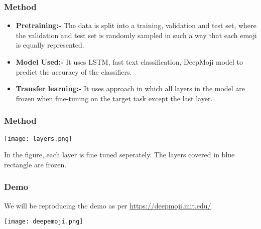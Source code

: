 \documentclass{beamer}
\begin{document}
\begin{frame}
\frametitle{Method}
\begin{itemize}
\item \textbf{Pretraining:-} The data is split into a training, validation and test set, where the validation and test set is randomly sampled in such a way that each emoji is equally represented.
\item \textbf{Model Used:-} It uses LSTM, fast text classification, DeepMoji model to predict the accuracy of the classifiers.
\item \textbf{Transfer learning:-} It uses approach in which 
all layers in the model are frozen when fine-tuning on the target task except the last layer.
\end{itemize}
\end{frame}


\begin{frame}
\frametitle{Method}
\texttt{[image: layers.png]}
\vspace{5mm} %

In the figure, each layer is fine tuned seperately. The layers covered in blue rectangle are frozen.
\end{frame}




\begin{frame}

\frametitle{Demo}

We will be reproducing the demo as per \url{https://deepmoji.mit.edu/}

\texttt{[image: deepemoji.png]}

\end{frame}
\end{document}
